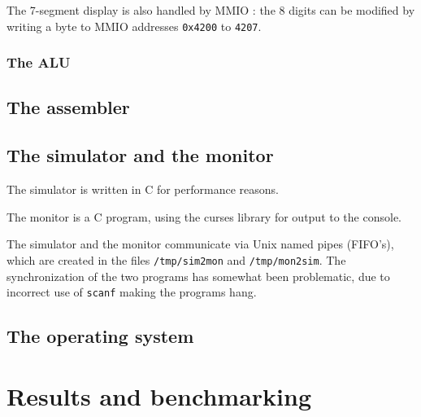 \documentclass[11pt, a4paper]{article}
\newcommand{\prog}[1]{{\tt#1}}
\begin{document}
The 7-segment display is also handled by MMIO : the 8 digits can be modified by writing a byte to MMIO addresses
\prog{0x4200} to \prog{4207}.

\subsubsection{The ALU}

\subsection{The assembler}

\subsection{The simulator and the monitor}

The simulator is written in C for performance reasons.

The monitor is a C program, using the curses library for output to the console.

The simulator and the monitor communicate via Unix named pipes (FIFO's), which are created in
the files \prog{/tmp/sim2mon} and \prog{/tmp/mon2sim}. The synchronization of the two programs
has somewhat been problematic, due to incorrect use of \prog{scanf} making the programs hang.

\subsection{The operating system}

\section{Results and benchmarking}
\end{document}
